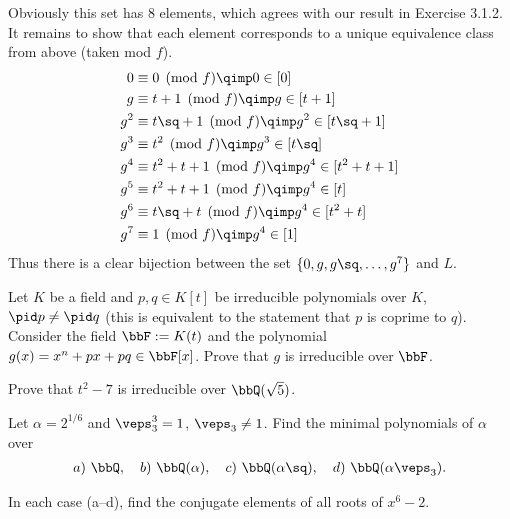 \documentclass{article}
\begin{document}
\begin{solution}
Obviously this set has 8 elements, which agrees with our result in Exercise 3.1.2. It remains to show that each element corresponds to a unique equivalence class from above (taken mod $ f $).
\begin{align*}
  0   &\equiv 0\pmod f \qimp 0 \in [0] \\
  g   &\equiv t+1\pmod f \qimp g\in [t+1] \\
  g^2 &\equiv t\sq+1\pmod f \qimp g^2\in [t\sq+1] \\
  g^3 &\equiv t^2 \pmod f \qimp g^3\in [t\sq] \\
  g^4 &\equiv t^2+t+1 \pmod f \qimp g^4\in [t^2+t+1] \\
  g^5 &\equiv t^2+t+1 \pmod f \qimp g^4\in [t] \\
  g^6 &\equiv t\sq+t \pmod f \qimp g^4\in [t^2+t] \\
  g^7 &\equiv 1 \pmod f \qimp g^4\in [1]
\end{align*}
Thus there is a clear bijection between the set $ \{0,g,g\sq,\ldots,g^7\} $ and $ L $.
\end{solution}

\begin{exercise}
Let $K$ be a field and $p, q \in K[t]$ be irreducible polynomials over $K$, $\pid p \neq \pid q$ (this is equivalent to the statement that $p$ is coprime to $q$). Consider the field $\bbF := K(t)$ and the polynomial $g(x) = x^n + px + pq \in \bbF[x]$. Prove that $g$ is irreducible over $\bbF$.
\end{exercise}

\begin{exercise}
Prove that $ t^2 -7 $ is irreducible over $ \bbQ(\sqrt 5) $.
\end{exercise}

\begin{subexercise}
Let $ \alpha=2^{1/6} $ and $ \veps_3^3=1 $, $ \veps_3\neq 1 $. Find the minimal polynomials of $ \alpha $ over \begin{align*}
  a)\ \bbQ, \quad b)\ \bbQ(\alpha), \quad c)\ \bbQ(\alpha\sq), \quad d)\ \bbQ(\alpha\veps_3).
\end{align*}
\end{subexercise}

\begin{subexercise}
In each case (a--d), find the conjugate elements of all roots of $ x^6-2 $.
\end{subexercise}
\end{document}
